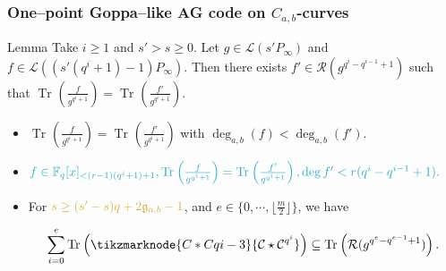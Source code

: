 \documentclass[
10pt, %
%
aspectratio=169, %
]{beamer}
\theoremstyle{plain}%
\theoremstyle{definition}
\theoremstyle{remark}
\newcommand{\calP}{\mathcal{P}}
\newcommand{\calL}{\mathcal{L}}
\newcommand{\calC}{\mathcal{C}}
\newcommand{\calR}{\mathcal{R}}
\newcommand{\calX}{\mathcal{X}}
\newcommand{\fq}{\mathbb{F}_{q}}
\newcommand{\Tr}[1]{\operatorname{Tr}_{}\left(#1\right)}
\newcommand{\GRS}{\operatorname{\mathsf{GRS}}}
\newcommand{\degab}[1]{\deg_{a,b}\left(#1\right)}
\newcommand\highlightnode[2]{ %
	\node (#1-frame)[rounded corners,fit=(#1),inner sep=2pt,fill=#2,fill opacity=0.17] {};
}
\begin{document}
\begin{frame}
	\frametitle{One--point Goppa--like AG code on $C_{a,b}$-curves}
	
	\begin{block}{Lemma \cite{lhotel2023goppa}}
		Take $i \geq 1$ and $s'>s \geq 0$. Let $g \in \calL\left(s'P_\infty\right)$ and $f \in \calL\left(\left(s'(q^i+1)-1\right)P_\infty\right)$. Then there exists $f' \in \calR\left(g^{q^i-q^{i-1}+1}\right)$ such that $\Tr{\frac{f}{g^{q^i+1}}} = \Tr{\frac{f'}{g^{q^i+1}}} $.
	\end{block}


	\begin{itemize}
		\item $\Tr{\frac{f}{g^{q^i+1}}} = \Tr{\frac{f'}{g^{q^i+1}}}$ with $\degab{f}<\degab{f'}$.
		\item[\textrightarrow] $\mathcolor{ballblue}{f \in \fq[x]_{<(r-1)(q^i+1)+1}, \Tr{\frac{f}{g^{q^i +1}}}=\Tr{\frac{f'}{g^{q^i +1}}}, \deg f'<r(q^i -q^{i-1}+1).}$
		\item For $\mathcolor{gold}{s \geq (s'-s)q+2\mathfrak{g}_{a,b}-1}$, and $e\in \{0,\cdots,\lfloor \frac{m}{2}\rfloor\}$, we have
		\vspace{-0.6em}
		
		$$ \sum \limits_{i=0}^{e}\Tr{\tikzmarknode{C*Cqi-3}{\calC\star\calC^{q^i}}} \subseteq \Tr{\calR(g^{q^{e}-q^{e-1}+1})}.$$
	\end{itemize}
\end{frame}
%
%		
\end{document}
